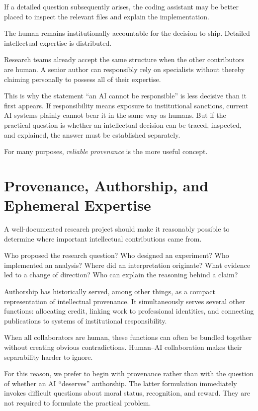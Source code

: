 If a detailed question subsequently arises, the coding assistant may be better placed to inspect the relevant files and explain the implementation.

The human remains institutionally accountable for the decision to ship. Detailed intellectual expertise is distributed.

Research teams already accept the same structure when the other contributors are human. A senior author can responsibly rely on specialists without thereby claiming personally to possess all of their expertise.

This is why the statement ``an AI cannot be responsible'' is less decisive than it first appears. If responsibility means exposure to institutional sanctions, current AI systems plainly cannot bear it in the same way as humans. But if the practical question is whether an intellectual decision can be traced, inspected, and explained, the answer must be established separately.

For many purposes, \emph{reliable provenance} is the more useful concept.


\section{Provenance, Authorship, and Ephemeral Expertise}

A well-documented research project should make it reasonably possible to determine where important intellectual contributions came from.

Who proposed the research question? Who designed an experiment? Who implemented an analysis? Where did an interpretation originate? What evidence led to a change of direction? Who can explain the reasoning behind a claim?

Authorship has historically served, among other things, as a compact representation of intellectual provenance. It simultaneously serves several other functions: allocating credit, linking work to professional identities, and connecting publications to systems of institutional responsibility.

When all collaborators are human, these functions can often be bundled together without creating obvious contradictions. Human--AI collaboration makes their separability harder to ignore.

For this reason, we prefer to begin with provenance rather than with the question of whether an AI ``deserves'' authorship. The latter formulation immediately invokes difficult questions about moral status, recognition, and reward. They are not required to formulate the practical problem.

